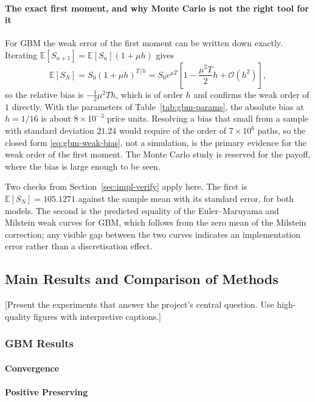 \documentclass[11pt,a4paper]{article}
\theoremstyle{definition}
\theoremstyle{remark}
\begin{document}
\paragraph{The exact first moment, and why Monte Carlo is not the right tool for it}
For GBM the weak error of the first moment can be written down exactly. Iterating $\mathbb{E}[S_{n+1}] = \mathbb{E}[S_n](1 + \mu h)$ gives
\begin{equation}
    \mathbb{E}[S_N] = S_0 (1 + \mu h)^{T/h}
    = S_0 e^{\mu T} \left[ 1 - \frac{\mu^2 T}{2} h + \mathcal{O}(h^2) \right],
    \label{eq:gbm-weak-bias}
\end{equation}
so the relative bias is $-\tfrac12 \mu^2 T h$, which is of order $h$ and confirms the weak order of $1$ directly. With the parameters of Table~\ref{tab:gbm-params}, the absolute bias at $h = 1/16$ is about $8 \times 10^{-3}$ price units. Resolving a bias that small from a sample with standard deviation $21.24$ would require of the order of $7 \times 10^{6}$ paths, so the closed form \eqref{eq:gbm-weak-bias}, not a simulation, is the primary evidence for the weak order of the first moment. The Monte Carlo study is reserved for the payoff, where the bias is large enough to be seen.

Two checks from Section~\ref{sec:impl-verify} apply here. The first is $\mathbb{E}[S_N] = 105.1271$ against the sample mean with its standard error, for both models. The second is the predicted equality of the Euler--Maruyama and Milstein weak curves for GBM, which follows from the zero mean of the Milstein correction; any visible gap between the two curves indicates an implementation error rather than a discretisation effect.

\subsection{Main Results and Comparison of Methods}
[Present the experiments that answer the project's central question. Use
high-quality figures with interpretive captions.]

\subsubsection{GBM Results}
\paragraph{Convergence}
\paragraph{Positive Preserving}
\end{document}
